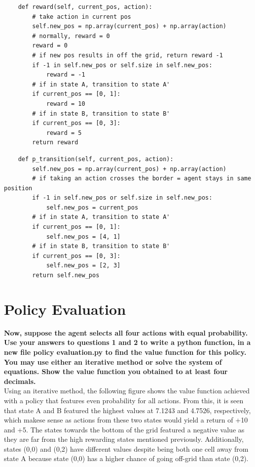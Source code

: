 \documentclass[11pt]{article}
\begin{document}
\lstset{basicstyle=\footnotesize}
\begin{lstlisting}
    def reward(self, current_pos, action):
        # take action in current pos
        self.new_pos = np.array(current_pos) + np.array(action)
        # normally, reward = 0
        reward = 0
        # if new pos results in off the grid, return reward -1
        if -1 in self.new_pos or self.size in self.new_pos:
            reward = -1
        # if in state A, transition to state A'
        if current_pos == [0, 1]:
            reward = 10
        # if in state B, transition to state B'
        if current_pos == [0, 3]:
            reward = 5
        return reward
\end{lstlisting}

\lstset{basicstyle=\footnotesize}
\begin{lstlisting}
    def p_transition(self, current_pos, action):
        self.new_pos = np.array(current_pos) + np.array(action)
        # if taking an action crosses the border = agent stays in same position
        if -1 in self.new_pos or self.size in self.new_pos: 
            self.new_pos = current_pos
        # if in state A, transition to state A'
        if current_pos == [0, 1]:
            self.new_pos = [4, 1]
        # if in state B, transition to state B'
        if current_pos == [0, 3]:
            self.new_pos = [2, 3]
        return self.new_pos
\end{lstlisting}


\newpage
\section{Policy Evaluation}
\textbf{Now, suppose the agent selects all four actions with equal probability. Use your
answers to questions 1 and 2 to write a python function, in a new file policy
evaluation.py to find the value function for this policy. You may use either an
iterative method or solve the system of equations. Show the value function you
obtained to at least four decimals.}
\\

\noindent
Using an iterative method, the following figure shows the value function
achieved with a policy that features even probability for all actions. From
this, it is seen that state A and B featured the highest values at 7.1243 and
4.7526, respectively, which makese sense as actions from these two states would
yield a return of +10 and +5. The states towards the bottom of the grid featured
a negative value as they are far from the high rewarding states mentioned
previously. Additionally, states (0,0) and (0,2) have different values despite
being both one cell away from state A because state (0,0) has a higher chance of
going off-grid than state (0,2).
\end{document}
